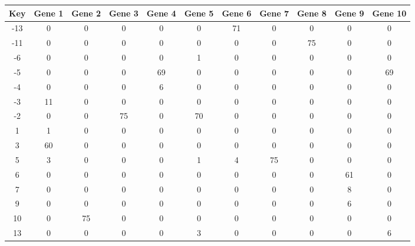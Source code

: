 \begin{tabular}{|c|c|c|c|c|c|c|c|c|c|c|}
\hline
Key & Gene 1 & Gene 2 & Gene 3 & Gene 4 & Gene 5 & Gene 6 & Gene 7 & Gene 8 & Gene 9 & Gene 10 \\
\hline
-13 & 0 & 0 & 0 & 0 & 0 & 71 & 0 & 0 & 0 & 0 \\
-11 & 0 & 0 & 0 & 0 & 0 & 0 & 0 & 75 & 0 & 0 \\
-6 & 0 & 0 & 0 & 0 & 1 & 0 & 0 & 0 & 0 & 0 \\
-5 & 0 & 0 & 0 & 69 & 0 & 0 & 0 & 0 & 0 & 69 \\
-4 & 0 & 0 & 0 & 6 & 0 & 0 & 0 & 0 & 0 & 0 \\
-3 & 11 & 0 & 0 & 0 & 0 & 0 & 0 & 0 & 0 & 0 \\
-2 & 0 & 0 & 75 & 0 & 70 & 0 & 0 & 0 & 0 & 0 \\
1 & 1 & 0 & 0 & 0 & 0 & 0 & 0 & 0 & 0 & 0 \\
3 & 60 & 0 & 0 & 0 & 0 & 0 & 0 & 0 & 0 & 0 \\
5 & 3 & 0 & 0 & 0 & 1 & 4 & 75 & 0 & 0 & 0 \\
6 & 0 & 0 & 0 & 0 & 0 & 0 & 0 & 0 & 61 & 0 \\
7 & 0 & 0 & 0 & 0 & 0 & 0 & 0 & 0 & 8 & 0 \\
9 & 0 & 0 & 0 & 0 & 0 & 0 & 0 & 0 & 6 & 0 \\
10 & 0 & 75 & 0 & 0 & 0 & 0 & 0 & 0 & 0 & 0 \\
13 & 0 & 0 & 0 & 0 & 3 & 0 & 0 & 0 & 0 & 6 \\
\hline
\end{tabular}